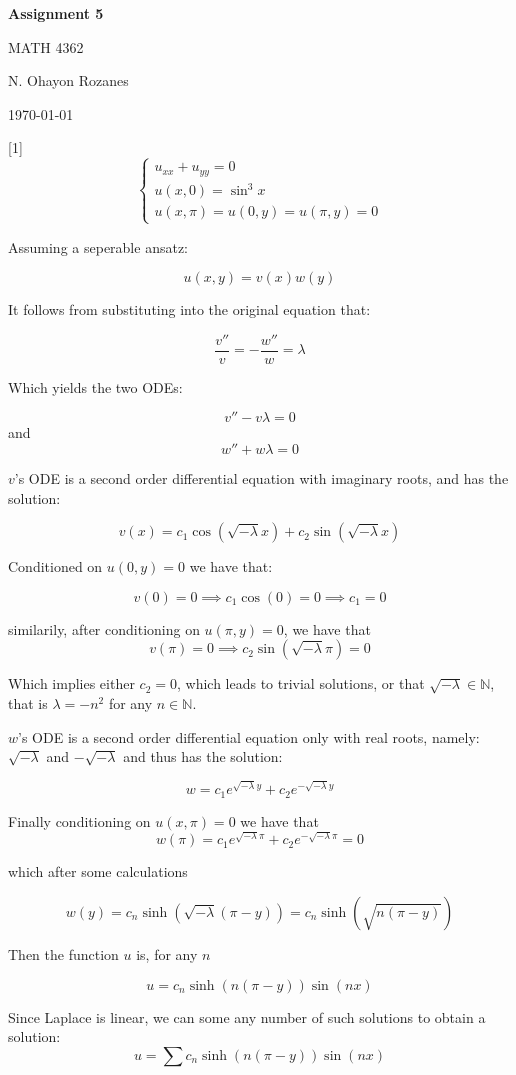 \documentclass{article} %
\newcommand{\question}[2][]{
  \begin{flushleft}
    \textbf{Question #1}: \textit{#2}

\end{flushleft}}
\newcommand{\maketitletwo}[2][]{
  \begin{center}
    \Large{\textbf{Assignment #1}

    MATH 4362} %
    \vspace{5pt}

    \normalsize{N. Ohayon Rozanes  %

    \today}        %
    \vspace{15pt}

\end{center}}
\begin{document}
\maketitletwo[5]  %

\question[1]{}
\[
  \begin{cases}
    u_{xx} + u_{yy} = 0 \\
    u(x,0) = \sin^3x\\
    u(x,\pi) = u(0, y) = u(\pi, y) = 0
  \end{cases}
\]

Assuming a seperable ansatz:

$$
u(x,y) = v(x)w(y)
$$

It follows from substituting into the original equation that:

\[
  \frac{v''}{v} = -\frac{w''}{w} = \lambda
\]

Which yields the two ODEs:

\[
  v'' - v\lambda = 0
\]
and
\[
  w'' + w\lambda = 0
\]

$v$'s ODE is a second order differential equation with imaginary
roots, and has the solution:

$$
v(x) = c_1 \cos(\sqrt{-\lambda}x) + c_2\sin(\sqrt{-\lambda}x)
$$

Conditioned on $u(0,y) = 0$ we have that:

\[
  v(0) = 0 \implies c_1\cos(0) = 0 \implies c_1 = 0
\]

similarily, after conditioning on $u(\pi, y) = 0$, we have that
\[
  v(\pi) = 0 \implies c_2\sin(\sqrt{-\lambda}\pi) = 0
\]

Which implies either $c_2 = 0$, which leads to trivial solutions, or
that $\sqrt{-\lambda} \in \mathbb{N}$, that is $\lambda = -n^2$ for
any $n \in \mathbb{N}$.

$w$'s ODE is a second order differential equation only with real
roots, namely: $\sqrt{-\lambda}$ and $-\sqrt{-\lambda}$ and thus has
the solution:

\[
  w = c_1 e^{\sqrt{-\lambda}y} + c_2e^{-\sqrt{-\lambda}y}
\]

Finally conditioning on $u(x,\pi) = 0$ we have that
\[
  w(\pi) = c_1 e^{\sqrt{-\lambda}\pi} + c_2e^{-\sqrt{-\lambda}\pi} = 0
\]

which after some calculations

\[
  w(y) = c_n \sinh(\sqrt{-\lambda}(\pi-y)) = c_n\sinh(\sqrt{n(\pi-y)})
\]

Then the function $u$ is, for any $n$

$$
u = c_n \sinh(n(\pi-y))\sin(nx)
$$

Since Laplace is linear, we can some any number of such solutions to
obtain a solution:
$$
u = \sum c_n \sinh(n(\pi-y))\sin(nx)
$$
\end{document}
